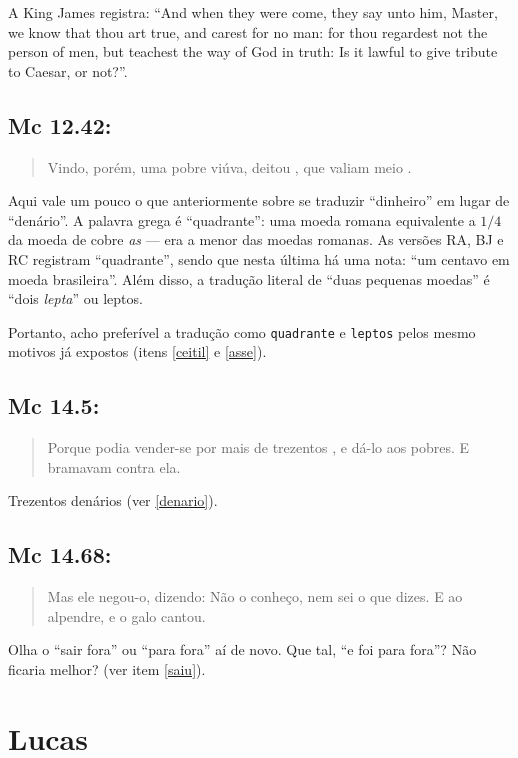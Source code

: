 A King James registra: ``And when they were come, they say unto him,
Master, we know that thou art true, and carest for no man: for thou
regardest not the person of men, but teachest the way of God in truth:
Is it lawful to give tribute to Caesar, or not?''.

\subsection{Mc 12.42:}
\begin{quote}
    \small
Vindo, porém, uma pobre viúva, deitou , que valiam meio .
\end{quote}

Aqui vale um pouco o que anteriormente sobre se traduzir ``dinheiro''
em lugar de ``denário''. A palavra grega é ``quadrante'': uma moeda
romana equivalente a $1/4$ da moeda de cobre \emph{as} --- era a menor
das moedas romanas. As versões RA, BJ e RC registram ``quadrante'',
sendo que nesta última há uma nota: ``um centavo em moeda
brasileira''. Além disso, a tradução literal de ``duas pequenas
moedas'' é ``dois \emph{lepta}'' ou leptos.

Portanto, acho preferível a tradução como \texttt{quadrante} e \texttt{leptos} pelos mesmo motivos já expostos (itens \ref{ceitil} e \ref{asse}).

\subsection{Mc 14.5:}
\begin{quote}
    \small
Porque podia vender-se por mais de trezentos , e dá-lo aos pobres. E bramavam contra ela.
\end{quote}

Trezentos denários (ver \ref{denario}).

\subsection{Mc 14.68:}
\begin{quote}
    \small
Mas ele negou-o, dizendo: Não o conheço, nem sei o que
dizes. E  ao alpendre, e o galo cantou.
    \end{quote}
    
Olha o ``sair fora'' ou ``para fora'' aí de novo. Que tal, ``e foi para fora''? Não ficaria melhor? (ver item \ref{saiu}).

\section{Lucas}
